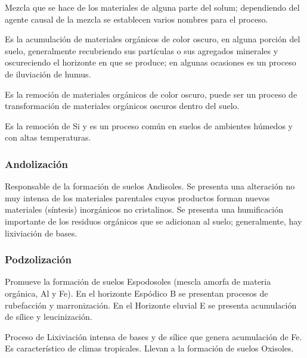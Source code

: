 \begin{definition}[Edafoturbación]
    Mezcla que se hace de los materiales de alguna parte del solum; dependiendo del agente causal de la mezcla se establecen varios nombres para el proceso.
\end{definition}


\begin{definition}[Melanización]
    Es la acumulación de materiales orgánicos de color oscuro, en alguna porción del suelo, generalmente recubriendo sus partículas o sus agregados minerales y oscureciendo el horizonte en que se produce; en algunas ocasiones es un proceso de iluviación de humus.
\end{definition}

\begin{definition}[Leucinización]
Es la remoción de materiales orgánicos de color oscuro, puede ser un proceso de transformación de materiales orgánicos oscuros dentro del suelo.
\end{definition}

\begin{definition}[Desilicación]
Es la remoción de Si y es un proceso común en suelos de ambientes húmedos y con altas temperaturas.
\end{definition}

\subsubsection{Andolización}

Responsable de la formación de suelos Andisoles.
Se presenta una alteración no muy intensa de los materiales parentales cuyos productos forman nuevos materiales (síntesis) inorgánicos no cristalinos.
Se presenta una humificación importante de los residuos orgánicos que se adicionan al suelo; generalmente, hay lixiviación de bases.

\subsubsection{Podzolización}

Promueve la formación de suelos Espodosoles (mescla amorfa de materia orgánica, Al y Fe).
En el horizonte Espódico B se presentan procesos de rubefacción y marronización.
En el Horizonte eluvial E se presenta acumulación de sílice y leucinización.

\begin{definition}[Ferralitización]
    Proceso de Lixiviación intensa de bases y de sílice que genera acumulación de Fe. Es característico de climas tropicales.
    Llevan a la formación de suelos Oxisoles.
\end{definition}
